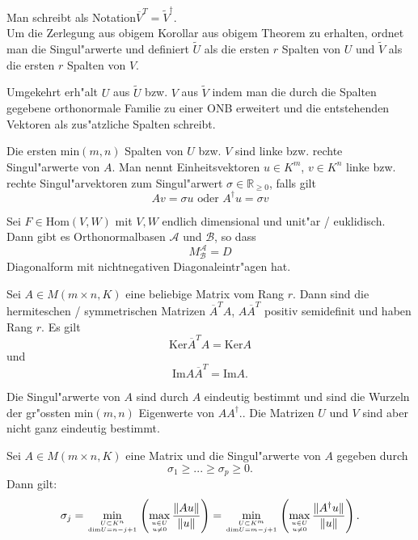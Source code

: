 \documentclass[11pt, a4paper]{article}
\begin{document}
\begin{remark}
Man schreibt als Notation$\overline{V}^T = \tilde{V}^{\dagger}$.
\\
Um die Zerlegung aus obigem Korollar aus obigem Theorem zu erhalten, ordnet man die Singul"arwerte und definiert $\tilde{U}$ als die ersten $r$ Spalten von $U$ und $\tilde{V}$ als die ersten $r$ Spalten von $V$.

Umgekehrt erh"alt $U$ aus $\tilde{U}$ bzw. $V$ aus $\tilde{V}$ indem man die durch die Spalten gegebene orthonormale Familie zu einer ONB erweitert und die entstehenden Vektoren als zus"atzliche Spalten schreibt.
\end{remark}


\begin{definition}
Die ersten $\mathrm{min}(m, n)$ Spalten von $U$ bzw. $V$ sind linke bzw. rechte Singul"arwerte von $A$. Man nennt Einheitsvektoren $u \in K^m$, $v \in K^n$ linke bzw. rechte Singul"arvektoren zum Singul"arwert $\sigma \in \mathbb{R}_{\geq 0}$, falls gilt
$$
Av = \sigma u \text{ oder } A^\dagger u = \sigma v
$$
\end{definition}

\begin{corollary}
Sei $F \in \mathrm{Hom}(V, W)$ mit $V, W$ endlich dimensional und unit"ar / euklidisch. Dann gibt es Orthonormalbasen $\mathcal{A}$ und $\mathcal{B}$, so dass 
$$
M^\mathcal{A}_\mathcal{B} = D
$$
Diagonalform mit nichtnegativen Diagonaleintr"agen hat.
\end{corollary}

\begin{lemma}
Sei $A \in M (m \times n, K)$ eine beliebige Matrix vom Rang $r$. Dann sind die hermiteschen / symmetrischen Matrizen $\overline{A}^T A$, $A\overline{A}^T$ positiv semidefinit und haben Rang $r$. Es gilt
$$
\mathrm{Ker} \overline{A}^T A = \mathrm{Ker} A
$$
und
$$
\mathrm{Im} A \overline{A}^T = \mathrm{Im} A.
$$
\end{lemma}

\begin{remark}
Die Singul"arwerte von $A$ sind durch $A$ eindeutig bestimmt und sind die Wurzeln der gr"ossten $\mathrm{min}(m, n)$ Eigenwerte von $AA^\dagger$.. Die Matrizen $U$ und $V$ sind aber nicht ganz eindeutig bestimmt.
\end{remark}

\begin{corollary}
Sei $A \in M(m \times n, K)$ eine Matrix und die Singul"arwerte von $A$ gegeben durch
$$
\sigma_1 \geq ... \geq \sigma_p \geq 0.
$$
Dann gilt:
$$
\sigma_j = \min\limits_{U \subset K^n \atop \mathrm{dim}U = n-j+1} \left(   \max\limits_{u \in U \atop u \neq 0} \frac{\|Au\|}{\|u\|}\right) = \min\limits_{U \subset K^m \atop \mathrm{dim} U = m - j + 1} \left(   \max\limits_{ u \in U \atop u \neq 0 } \frac{ \|A^\dagger u\| }{ \|u\| } \right).
$$
\end{corollary}
\end{document}
